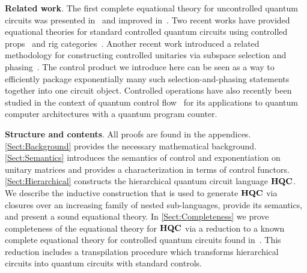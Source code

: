 \vspace{1em}
\noindent
\textbf{Related work}.
The first complete equational theory for uncontrolled quantum circuits was presented in~\cite{Clement2023} and improved in~\cite{Clement2024Extensions,Clement2024Minimal}. 
Two recent works have provided equational theories for standard controlled quantum circuits using controlled props~\cite{Delorme2025} and rig categories~\cite{Heunen2025}. 
Another recent work introduced a related methodology for constructing controlled unitaries via subspace selection and phasing~\cite{Heunen2026}.
The control product we introduce here can be seen as a way to efficiently package exponentially many such selection-and-phasing statements together into one circuit object.
Controlled operations have also recently been studied in the context of quantum control flow~\cite{Yuan2024,Valiron2022} for its applications to quantum computer architectures with a quantum program counter. 

\vspace{1em}
\noindent
\textbf{Structure and contents}.
All proofs are found in the appendices.
\cref{Sect:Background} provides the necessary mathematical background.
\cref{Sect:Semantics} introduces the semantics of control and exponentiation on unitary matrices and provides a characterization in terms of control functors.
\cref{Sect:Hierarchical} constructs the hierarchical quantum circuit language $\mathbf{HQC}$.
We describe the inductive construction that is used to generate $\mathbf{HQC}$ via closures over an increasing family of nested sub-languages, provide its semantics, and present a sound equational theory.
In \cref{Sect:Completeness} we prove completeness of the equational theory for $\mathbf{HQC}$ via a reduction to a known complete equational theory for controlled quantum circuits found in~\cite{Delorme2025}. 
This reduction includes a transpilation procedure which transforms hierarchical circuits into quantum circuits with standard controls.
